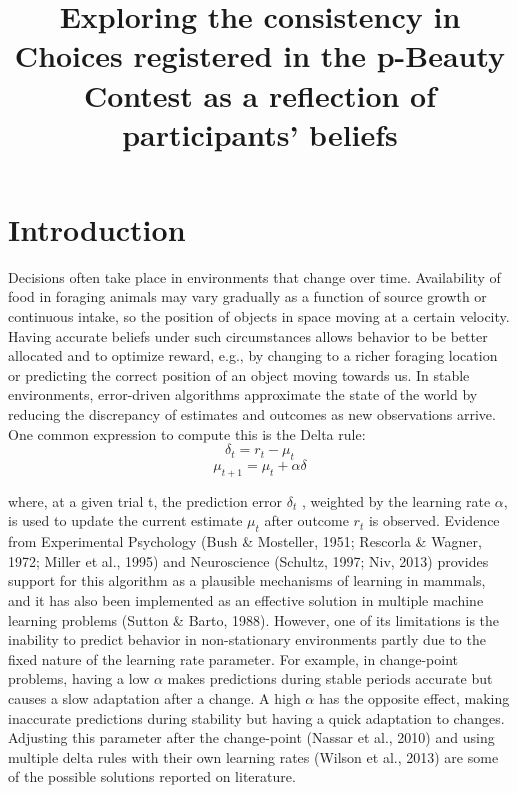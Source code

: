 \documentclass[jou,apacite]{apa6}
\title{Exploring the consistency in Choices registered in the p-Beauty Contest as a reflection of participants' beliefs}
\begin{document}
\maketitle    

\section{Introduction}

Decisions often take place in environments that change over time. Availability of food in foraging animals may vary gradually as a function of source growth or continuous intake, so the position of objects in space moving at a certain velocity. Having accurate beliefs under such circumstances allows behavior to be better allocated and to optimize reward, e.g., by changing to a richer foraging location or predicting the correct position of an object moving towards us. In stable environments, error-driven algorithms approximate the state of the world by reducing the discrepancy of estimates and outcomes as new observations arrive. One common expression to compute this is the Delta rule: $$\delta_t = r_t - \mu_t$$
\begin{equation}
\mu_{t+1} = \mu_t + \alpha\delta
\end{equation}

where, at a given trial t, the prediction error $\delta_t$ , weighted by the learning rate $\alpha$, is used to update the current estimate $\mu_t$ after outcome $r_t$  is observed. Evidence from Experimental Psychology (Bush \& Mosteller, 1951; Rescorla \& Wagner, 1972; Miller et al., 1995) and Neuroscience (Schultz, 1997; Niv, 2013) provides support for this algorithm as a plausible mechanisms of learning in mammals, and it has also been implemented as an effective solution in multiple machine learning problems (Sutton \& Barto, 1988). However, one of its limitations is the inability to predict behavior in non-stationary environments partly due to the fixed nature of the learning rate parameter. For example, in change-point problems, having a low $\alpha$ makes predictions during stable periods accurate but causes a slow adaptation after a change. A high $\alpha$ has the opposite effect, making inaccurate predictions during stability but having a quick adaptation to changes. Adjusting this parameter after the change-point (Nassar et al., 2010) and using multiple delta rules with their own learning rates (Wilson et al., 2013) are some of the possible solutions reported on literature.  
\end{document}
